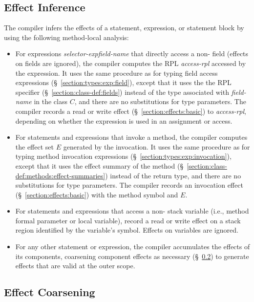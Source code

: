 \subsection{Effect Inference}
\label{section:effects:inference}

The compiler infers the effects of a statement, expression, or
statement block by using the following method-local analysis:
%
\begin{itemize}
%
\item For expressions \emph{selector-exp}\emph{field-name} that
  directly access a non- field (effects on 
  fields are ignored), the compiler computes the RPL \emph{access-rpl}
  accessed by the expression.  It uses the same procedure as for
  typing field access expressions
  (\S~\ref{section:types:exp:field}), except that it uses the
  the RPL specifier (\S~\ref{section:class-def:fields}) instead of the
  type associated with \emph{field-name} in the class $C$, and there
  are no substitutions for type parameters.  The compiler records a
  read or write effect (\S~\ref{section:effects:basic}) to
  \emph{access-rpl}, depending on whether the expression is used in an
  assignment or access.
%
\item For statements and expressions that invoke a method, the
  compiler computes the effect set $E$ generated by the invocation.
  It uses the same procedure as for typing method invocation
  expressions (\S~\ref{section:types:exp:invocation}), except that it
  uses the effect summary of the method
  (\S~\ref{section:class-def:methods:effect-summaries}) instead of the
  return type, and there are no substitutions for type parameters.
  The compiler records an invocation effect
  (\S~\ref{section:effects:basic}) with the method symbol and $E$.
%
\item For statements and expressions that access a non-
  stack variable (i.e., method formal parameter or local variable),
  record a read or write effect on a stack region identified by the
  variable's symbol.  Effects on  variables are ignored.
%
\item For any other statement or expression, the compiler accumulates
  the effects of its components, coarsening component effects as
  necessary (\S~\ref{section:effects:coarsening}) to generate effects
  that are valid at the outer scope.
%
\end{itemize}
%

\subsection{Effect Coarsening}
\label{section:effects:coarsening}

